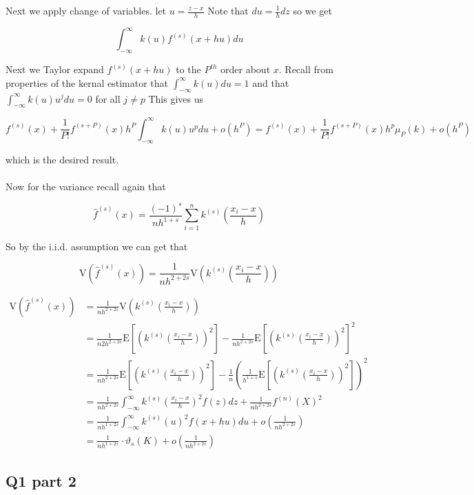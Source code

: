 \documentclass[11pt]{article}
\newcommand{\E}{\mathrm{E}}
\newcommand{\V}{\mathrm{V}}
\begin{document}
Next we apply change of variables. let $u = \frac{z - x}{h}$ Note that $du=\frac{1}{h}dz$ so we get 

$$ \int_{-\infty}^{\infty}  k(u)f^{(s)}(x+hu)du $$

Next we Taylor expand $f^{(s)}(x+hu)$ to the $P^{th}$ order about $x$. Recall from properties of the kernal estimator that $ \int_{-\infty}^{\infty}k(u)du = 1$ and that $ \int_{-\infty}^{\infty}k(u)u^jdu = 0$ for all $j\neq p$ This gives us

$$ f^{(s)}(x) +\frac{1}{P!}f^{(s+P)}(x)h^P\int_{-\infty}^{\infty}k(u)u^pdu +o(h^P)
= f^{(s)}(x) +\frac{1}{P!}f^{(s+P)}(x)h^p \mu_P(k) +o(h^P)
$$

which is the desired result. 
\\ \\ 

Now for the variance recall again that 

$$ \hat{f}^{(s)}(x) = \frac{(-1)^s}{nh^{1+s}} \sum_{i=1}^{n}k^{(s)} \left( \frac{{x}_i - x}{h} \right) 
$$

So by the i.i.d. assumption we can get that 

$$ \V \left(\hat{f}^{(s)}(x) \right) = \frac{1}{nh^{2+2s}} \V \left( k^{(s)} \left( \frac{{x}_i - x}{h} \right)  \right)
$$

\begin{align}
\V \left(\hat{f}^{(s)}(x) \right) &= \frac{1}{nh^{2+2s}} \V \left( k^{(s)} \left( \frac{{x}_i - x}{h} \right)  \right)\\
 &= \frac{1}{n2h^{2+2s}} \E \left[\left( k^{(s)} \left( \frac{{x}_i - x}{h} \right)  \right)^2 \right] - \frac{1}{nh^{2+2s}} \E \left[\left( k^{(s)} \left( \frac{{x}_i - x}{h} \right)  \right)^2 \right]^2 \\
  &= \frac{1}{nh^{2+2s}} \E \left[\left( k^{(s)} \left( \frac{{x}_i - x}{h} \right)  \right)^2 \right] - \frac{1}{n}\left( \frac{1}{h^{1+s}} \E \left[\left( k^{(s)} \left( \frac{{x}_i - x}{h} \right)  \right)^2 \right] \right)^2 \\
  &=  \frac{1}{nh^{2+2s}} \int_{-\infty}^{\infty}k^{(s)} \left( \frac{{x}_i - x}{h} \right)^2 f(z)dz +   \frac{1}{nh^{2+2s}} f^{(n)}(X)^2 \\
  &= \frac{1}{nh^{1+2s}} \int_{-\infty}^{\infty} k^{(s)}(u)^2f(x+hu)du + o\left(\frac{1}{nh^{2+2s}} \right)\\
  &= \frac{1}{nh^{1+2s}} \cdot \vartheta_s(K) + o\left(\frac{1}{nh^{2+2s}} \right)
\end{align}

\subsection{Q1 part 2}
\end{document}
